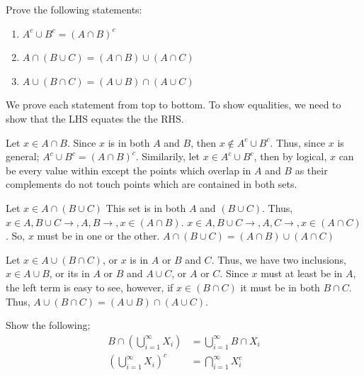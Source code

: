 \begin{problem}
    Prove the following statements:
    \begin{enumerate}[label=\arabic{*}.]
        \item $A^c \cup B^c = (A \cap B)^c$
        \item $A \cap (B \cup C) = (A\cap B) \cup (A\cap C)$
        \item $A \cup (B \cap C) = (A\cup B) \cap (A\cup C)$
    \end{enumerate}
\end{problem}
\begin{problem}
    We prove each statement from top to bottom. To show equalities, we need to show that the LHS equates the the RHS.

    Let $x\in A\cap B$. Since $x$ is in both $A$ and $B$, then $x\notin A^c \cup B^c$. Thus, since $x$ is general; $A^c \cup B^c = (A \cap B)^c$. Similarily, let $x\in A^c \cup B^c$, then by logical, $x$ can be every value within except the points which overlap in $A$ and $B$ as their complements do not touch points which are contained in both sets. 

    Let $x\in A \cap (B\cup C)$ This set is in both $A$ and $(B\cup C)$. Thus, $x\in A, B\cup C \rightarrow, A, B \rightarrow, x \in (A\cap B)$. $x\in A, B\cup C \rightarrow, A, C \rightarrow, x \in (A\cap C)$. So, $x$ must be in one or the other. $A \cap (B \cup C) = (A\cap B) \cup (A\cap C)$

    Let $x\in A \cup (B\cap C)$, or $x$ is in $A$ or $B$ and $C$. Thus, we have two inclusions, $x \in A\cup B$, or its in $A$ or $B$ and $A \cup C$, or $A$ or $C$. Since $x$ must at least be in $A$, the left term is easy to see, however, if $x\in (B \cap C)$ it must be in both $B\cap C$. Thus, $A \cup (B \cap C) = (A\cup B) \cap (A\cup C)$.
\end{problem}

\begin{problem}
    Show the following;
    \begin{align*}
            B \cap \left(\bigcup_{i=1}^\infty X_i\right) &=     \bigcup_{i=1}^\infty B \cap X_i  \\
            \left(\bigcup_{i=1}^\infty X_i\right)^c &=     \bigcap_{i=1}^\infty X_i^c
    \end{align*}
\end{problem}

